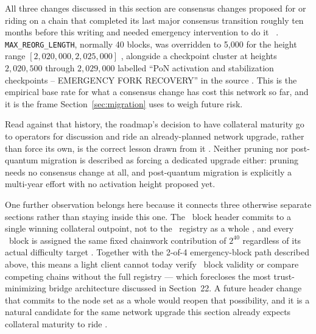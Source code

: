 All three changes discussed in this section are consensus changes proposed for or riding on a chain
that completed its last major consensus transition roughly ten months before this writing and needed
emergency intervention to do it \srcinferred\ .
\texttt{MAX\_REORG\_LENGTH}, normally 40 blocks, was overridden to 5{,}000 for the height range
$[2{,}020{,}000, 2{,}025{,}000]$ , alongside a checkpoint
cluster at heights $2{,}020{,}500$ through $2{,}029{,}000$ labelled ``PoN activation and stabilization
checkpoints -- EMERGENCY FORK RECOVERY'' in the source .
This is the empirical base rate for what a consensus change has cost this network so far, and it is the
frame Section~\ref{sec:migration} uses to weigh future risk.

Read against that history, the roadmap's decision to have collateral maturity go to operators for
discussion and ride an already-planned network upgrade, rather than force its own, is the correct
lesson drawn from it . Neither pruning nor post-quantum
migration is described as forcing a dedicated upgrade either: pruning needs no consensus change at all,
and post-quantum migration is explicitly a multi-year effort with no activation height proposed yet.

One further observation belongs here because it connects three otherwise separate sections rather than
staying inside this one. The \PoN\ block header commits to a single winning collateral outpoint, not to
the \FluxNode\ registry as a whole , and every
\PoN\ block is assigned the same fixed chainwork contribution of $2^{40}$ regardless of its actual
difficulty target . Together with the 2-of-4 emergency-block path
described above, this means a light client cannot today verify \PoN\ block validity or compare
competing chains without the full registry — which forecloses the most trust-minimizing bridge
architecture discussed in Section~22. A future header change that commits to the node set as a whole
would reopen that possibility, and it is a natural candidate for the same network upgrade this section
already expects collateral maturity to ride \srcinferred.

\FloatBarrier
